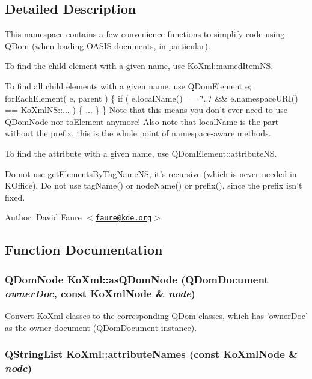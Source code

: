 \subsection{Detailed Description}
This namespace contains a few convenience functions to simplify code using QDom (when loading OASIS documents, in particular).

To find the child element with a given name, use \hyperlink{namespaceKoXml_f571b501c9481cab08bbcf9b9174e4f5}{KoXml::namedItemNS}.

To find all child elements with a given name, use QDomElement e; forEachElement( e, parent ) \{ if ( e.localName() == \char`\"{}...\char`\"{} \&\& e.namespaceURI() == KoXmlNS::... ) \{ ... \} \} Note that this means you don't ever need to use QDomNode nor toElement anymore! Also note that localName is the part without the prefix, this is the whole point of namespace-aware methods.

To find the attribute with a given name, use QDomElement::attributeNS.

Do not use getElementsByTagNameNS, it's recursive (which is never needed in KOffice). Do not use tagName() or nodeName() or prefix(), since the prefix isn't fixed.

\begin{Desc}
\item[Author:]David Faure $<$\href{mailto:faure@kde.org}{\tt faure@kde.org}$>$ \end{Desc}




\subsection{Function Documentation}
\hypertarget{namespaceKoXml_a9562d7b4abde19cd063e70ca966e582}{
\subsubsection[{asQDomNode}]{\setlength{\rightskip}{0pt plus 5cm}QDomNode KoXml::asQDomNode (QDomDocument {\em ownerDoc}, \/  const {\bf KoXmlNode} \& {\em node})}}
\label{namespaceKoXml_a9562d7b4abde19cd063e70ca966e582}


Convert \hyperlink{namespaceKoXml}{KoXml} classes to the corresponding QDom classes, which has 'ownerDoc' as the owner document (QDomDocument instance). \hypertarget{namespaceKoXml_4859eaf343a885dc2c69889271e16b6a}{
\subsubsection[{attributeNames}]{\setlength{\rightskip}{0pt plus 5cm}QStringList KoXml::attributeNames (const {\bf KoXmlNode} \& {\em node})}}
\label{namespaceKoXml_4859eaf343a885dc2c69889271e16b6a}


